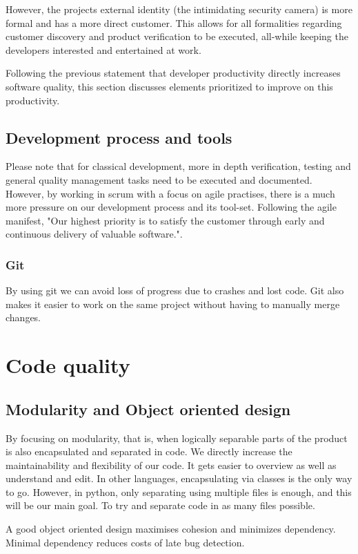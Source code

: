 \documentclass{article}
\begin{document}
However, the projects external identity (the intimidating security camera) is more formal and has a more direct customer.
This allows for all formalities regarding customer discovery and product verification to be executed, all-while keeping the developers interested and entertained at work.

Following the previous statement that developer productivity directly increases software quality, this section discusses elements prioritized to improve on this productivity.

\subsection{Development process and tools}
Please note that for classical development, more in depth verification, testing and general quality management tasks need to be executed and documented.
However, by working in scrum with a focus on agile practises, there is a much more pressure on our development process and its tool-set.
Following the agile manifest, "Our highest priority is to satisfy the customer through early and continuous delivery of valuable software.".

\subsubsection{Git}
By using git we can avoid loss of progress due to crashes and lost code.
Git also makes it easier to work on the same project without having to manually merge changes.


\section{Code quality}

\subsection{Modularity and Object oriented design}
By focusing on modularity, that is, when logically separable parts of the product is also encapsulated and separated in code.
We directly increase the maintainability and flexibility of our code.
It gets easier to overview as well as understand and edit. In other languages, encapsulating via classes is the only way to go. However, in python, only separating using multiple files is enough, and this will be our main goal. To try and separate code in as many files possible.

A good object oriented design maximises cohesion and minimizes dependency. Minimal dependency reduces costs of late bug detection.
\end{document}
